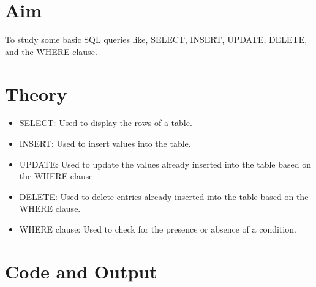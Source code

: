 \section{Aim}
 To study some basic SQL queries like, SELECT, INSERT, UPDATE, DELETE, and the WHERE clause.

\section{{Theory}}

\begin{itemize}
\item SELECT: Used to display the rows of a table. 
\item INSERT: Used to insert values into the table.
\item UPDATE: Used to update the values already inserted into the table based on the WHERE clause.
\item DELETE: Used to delete entries already inserted into the table based on the WHERE clause.
\item WHERE clause: Used to check for the presence or absence of a condition. 
\end{itemize}

\section{{Code and Output}}

